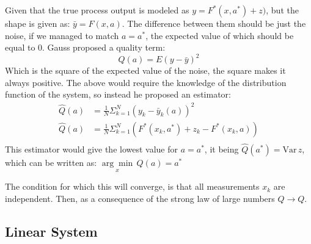 {
    Given that the true process output is modeled as $y = F^{*}(x,a^{*})+z)$, but the shape is given as: $\bar{y} = F(x,a)$. The difference between them should be just the noise, if we managed to match $a = a^{*}$, the expected value of which should be equal to 0.  Gauss proposed a quality term:
  \begin{equation}
      Q(a) = E(y-\bar{y})^{2}
 \end{equation}
 Which is the square of the expected value of the noise, the square makes it always positive.
 The above would require the knowledge of the distribution function of the system, so instead he proposed an estimator:
 \begin{equation}
     \begin{aligned}
         \hat{Q}(a) &= \frac{1}{N} \Sigma_{k=1}^{N}(y_k-\bar{y}_k(a))^{2}\\[1.25ex]
         \hat{Q}(a) &= \frac{1}{N}\Sigma_{k=1}^{N}(F^{*}(x_k,a^{*})+z_k - F^{*}(x_k,a))\\[1.25ex]
     \end{aligned}
 \end{equation}
 This estimator would give the lowest value for $a = a^{*}$, it being $\hat{Q}(a^{*}) = \text{Var}\,z$, which can be written as: $\underset{x}{\arg\min}\,Q(a) = a^{*}$ 

 The condition for which this will converge, is that all measurements $x_k$ are independent. Then, as a consequence of the strong law of large numbers  $\hat{Q} \rightarrow  Q$.

}

\subsection{Linear System}

